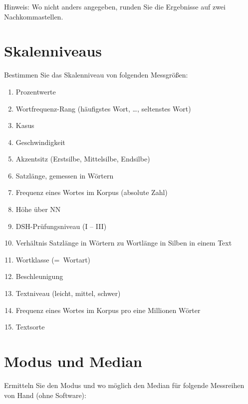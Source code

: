 \begin{center}
  Hinweis: Wo nicht anders angegeben, runden Sie die Ergebnisse auf zwei Nachkommastellen.
\end{center}

\section{Skalenniveaus}

Bestimmen Sie das Skalenniveau von folgenden Messgrößen:

\begin{enumerate}\Lf
  \item Prozentwerte 
  \item Wortfrequenz-Rang (häufigstes Wort, \ldots, seltenstes Wort) 
  \item Kasus 
  \item Geschwindigkeit 
  \item Akzentsitz (Erstsilbe, Mittelsilbe, Endsilbe) 
  \item Satzlänge, gemessen in Wörtern 
  \item Frequenz eines Wortes im Korpus (absolute Zahl) 
  \item Höhe über NN 
  \item DSH-Prüfungsniveau (I -- III) 
  \item Verhältnis Satzlänge in Wörtern zu Wortlänge in Silben in einem Text 
  \item Wortklasse (=~Wortart) 
  \item Beschleunigung 
  \item Textniveau (leicht, mittel, schwer) 
  \item Frequenz eines Wortes im Korpus pro eine Millionen Wörter 
  \item Textsorte 
\end{enumerate}

\section{Modus und Median}
\label{sec:modmed}

Ermitteln Sie den Modus und wo möglich den Median für folgende Messreihen von Hand (ohne Software):

